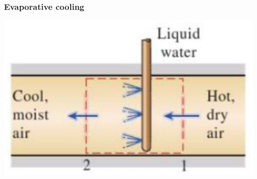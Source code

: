 \documentclass[11pt]{article}
\begin{document}
\subsubsection{Evaporative cooling}
\label{sec:org6f97d97}
\begin{center}
\includegraphics[scale=0.7]{./images/evaporative-cooling-diagram.png}
\end{center}
\end{document}
